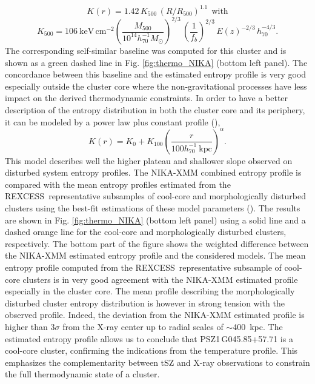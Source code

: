 \documentclass[traditabstract]{aa}
\newcommand{\rexcess}{{\gwpfont REXCESS}}
\begin{document}
\begin{equation}
K(r) = 1.42  \, K_{\mathrm{500}} \, (R/R_{\mathrm{500}})^{1.1}~~\mathrm{with}
\label{eq:baseline_entropy}
\end{equation}
$$K_{\mathrm{500}} = 106~\mathrm{keV \, cm^{-2}} \left(\frac{M_{\mathrm{500}}}{10^{14}h_{\mathrm{70}}^{-1}M_{\odot}}\right)^{2/3} \, \left(\frac{1}{f_b}\right)^{2/3} \, E(z)^{-2/3} \, h_{\mathrm{70}}^{-4/3}.$$
The corresponding self-similar baseline was computed for this cluster and is shown as a green dashed line in Fig. \ref{fig:thermo_NIKA} (bottom left panel). The concordance between this baseline and the estimated entropy profile is very good especially outside the cluster core where the non-gravitational processes have less impact on the derived thermodynamic constraints. In order to have a better description of the entropy distribution in both the cluster core and its periphery, it can be modeled by a power law plus constant profile (\citealt{entropy_constant}),
\begin{equation}
K(r) = K_0 + K_{100}\left(\frac{r}{100h^{-1}_{70}~\mathrm{kpc}}\right)^{\alpha}
\label{eq:entro_REXCESS}
.\end{equation}
This model describes well the higher plateau and shallower slope observed on disturbed system entropy profiles. The NIKA-XMM combined entropy profile is compared with the mean entropy profiles estimated from the \rexcess\ representative subsamples of cool-core and morphologically disturbed clusters using the best-fit estimations of these model parameters (\citealt{entropy_REXCESS}). The results are shown in Fig. \ref{fig:thermo_NIKA} (bottom left panel) using a solid line and a dashed orange line for the cool-core and morphologically disturbed clusters, respectively. The bottom part of the figure shows the weighted difference between the NIKA-XMM estimated entropy profile and the considered models. The mean entropy profile computed from the \rexcess\ representative subsample of cool-core clusters is in very good agreement with the NIKA-XMM estimated profile especially in the cluster core. The mean profile describing the morphologically disturbed cluster entropy distribution is however in strong tension with the observed profile. Indeed, the deviation from the NIKA-XMM estimated profile is higher than $3\sigma$ from the X-ray center up to radial scales of $\sim$400~kpc. The estimated entropy profile allows us to conclude that \mbox{PSZ1\,G045.85+57.71} is a cool-core cluster, confirming the indications from the temperature profile. This emphasizes the complementarity between tSZ and X-ray observations to constrain the full thermodynamic state of a cluster.\\ 
\end{document}
